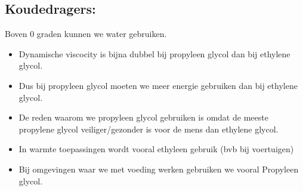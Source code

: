 \documentclass[12pt]{article}
\begin{document}
\subsection{Koudedragers:}
Boven 0 graden kunnen we water gebruiken.\begin{itemize}
    \item Dynamische viscocity is bijna dubbel bij propyleen glycol dan bij ethylene glycol.
    \item Dus bij propyleen glycol moeten we meer energie gebruiken dan bij ethylene glycol.
    \item De reden waarom we propyleen glycol gebruiken is omdat de meeste propylene glycol veiliger/gezonder is voor de mens dan ethylene glycol.
    \item In warmte toepassingen wordt vooral ethyleen gebruik (bvb bij voertuigen)
    \item Bij omgevingen waar we met voeding werken gebruiken we vooral Propyleen glycol.
\end{itemize}
\end{document}
